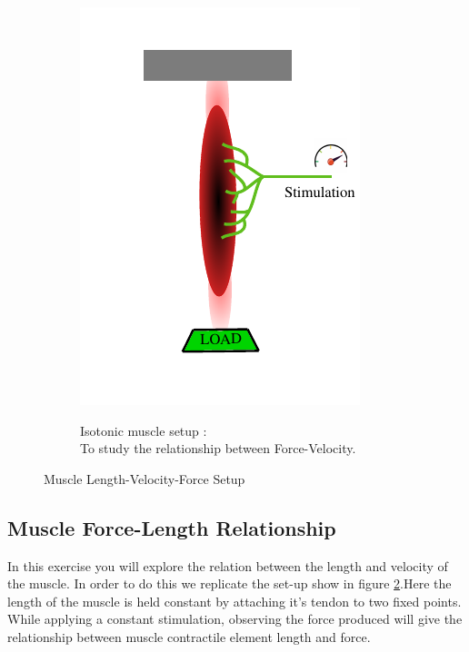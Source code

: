 \documentclass{cmc}
\begin{document}
\begin{figure}[H]
\begin{subfigure}[b]{0.49\textwidth}
{      \includegraphics[width=\textwidth]{figures/isotonic_muscle} }
    \caption{Isotonic muscle setup :\\ To study the relationship
      between Force-Velocity.}
    \label{fig:isotonic_muscle}
  \end{subfigure}
  \caption{Muscle Length-Velocity-Force Setup}
  \label{fig:muscle-setup}
\end{figure}

\subsection*{Muscle Force-Length Relationship}
\label{sec:muscle-force-length}
In this exercise you will explore the relation between the length and
velocity of the muscle. In order to do this we replicate the set-up
show in figure \ref{fig:muscle-setup}.Here the length of the muscle is
held constant by attaching it's tendon to two fixed points. While
applying a constant stimulation, observing the force produced will
give the relationship between muscle contractile element length and
force.
\end{document}

